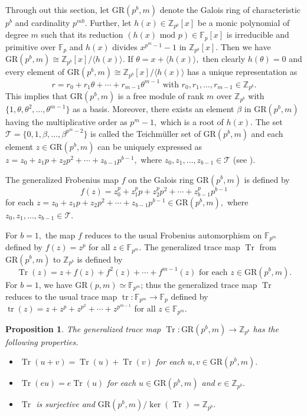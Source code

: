 \documentclass{article}
\DeclareMathOperator{\tr}{tr}
\DeclareMathOperator{\Tr}{Tr}
\newtheorem{prop}{Proposition}[section]
\theoremstyle{remark}
\theoremstyle{definition}
\numberwithin{equation}{section}
\begin{document}
Through out this section, let $\text{GR}(p^b,m)$ denote the Galois ring of characteristic $p^b$ and cardinality $p^{mb}.$  Further, let $h(x)\in \mathbb{Z}_{p^b}[x]$ be a monic polynomial of degree $m$ such that its reduction $(h(x) \text{ mod } p) \in \mathbb{F}_{p}[x]$ is irreducible and primitive over $\mathbb{F}_{p}$ and $h(x)$ divides $x^{p^m-1}-1$ in $\mathbb{Z}_{p^b}[x].$  Then we have  $\text{GR}(p^b,m) \cong \mathbb{Z}_{p^b}[x]/ \langle h(x) \rangle.$ If $\theta=x+\langle h(x) \rangle,$ then clearly $h(\theta)=0$ and every element of $\text{GR}(p^b,m) \cong \mathbb{Z}_{p^b}[x]/ \langle h(x) \rangle$ has a unique representation as $$r=r_0+r_1\theta+\cdots+r_{m-1}\theta^{m-1} \text{~with~} r_0,r_1,\ldots,r_{m-1} \in \mathbb{Z}_{p^b}.$$
This implies that $\text{GR}(p^b,m)$ is a free module of rank $m$ over  $\mathbb{Z}_{p^b}$ with $\{1,\theta,\theta^2,\ldots,\theta^{m-1}\}$ as a basis.
 Moreover,   there exists an element $\beta$  in $\text{GR}(p^b,m)$ having the multiplicative order as  $p^{m}-1,$ which is a root of $h(x).$ The set $\mathcal{T}= \{ 0,1, \beta,\ldots,\beta^{p^{m}-2} \}$ is called the Teichm\"{u}ller set of $\text{GR}(p^b,m)$ and each element $z \in \text{GR}(p^b,m)$ can be uniquely expressed as $z=z_0+ z_1 p+ z_2 p^2+\cdots + z_{b-1} p^{b-1},$ where $z_0,z_1,\ldots,z_{b-1} \in \mathcal{T}$ (see \cite[Chp. 14]{wan}). 

 
The generalized Frobenius map $f$ on the Galois ring $\text{GR}(p^b,m)$ is defined by $$f(z)=z^p_0+ z^p_1 p+ z^p_2 p^2+\cdots + z^p_{b-1} p^{b-1}$$ for each $z=z_0+ z_1 p+ z_2 p^2+\cdots + z_{b-1} p^{b-1} \in \text{GR}(p^b,m),$ where $z_0,z_1,\ldots,z_{b-1} \in \mathcal{T}.$  

For $b = 1,$ the map $f$ reduces to the usual Frobenius automorphism on $\mathbb{F}_{p^m}$ defined by $f(z)=z^p$ for all $z \in \mathbb{F}_{p^m}.$ 
The generalized trace map ${\Tr}$ from $\text{GR}(p^b,m)$ to $\mathbb{Z}_{p^b}$ is defined by 
$${\Tr}(z)=z+f(z)+f^2(z)+\cdots+f^{m-1}(z) \text{ for each } z \in \text{GR}(p^b,m).$$
For $b=1$, we have $\text{GR}(p,m)\simeq  \mathbb{F}_{p^m}$; thus the generalized trace map ${\Tr}$  reduces to the usual trace map  ${\tr}: \mathbb{F}_{p^m}  \to \mathbb{F}_{p}$  defined by ${\tr}(z) =z+z^p+z^{p^2}+\cdots+z^{p^{m-1}}$ for all $z \in \mathbb{F}_{p^m}.$ 
\begin{prop}\cite{sison}  The generalized trace map ${\Tr}:\text{GR}(p^b,m) \to  \mathbb{Z}_{p^b}$ has the following properties.
\begin{itemize}
\item ${\Tr}(u+v)={\Tr}(u)+{\Tr}(v)$ for each $u,v \in \text{GR}(p^b,m).$
\item  ${\Tr}(e u)=e{\Tr}(u)$ for each $u \in \text{GR}(p^b,m)$ and $e \in \mathbb{Z}_{p^b}.$
\item  ${\Tr}$ is surjective and $\text{GR}(p^b,m)/ \ker( {\Tr} )=\mathbb{Z}_{p^b}.$
\end{itemize}
\end{prop}
\end{document}
